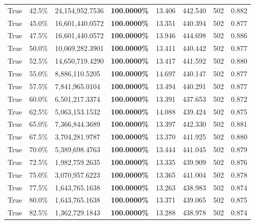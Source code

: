 \begin{table}[H]
{\begin{tabular}{lllrllll}
\cline{1-8}
True & 42.5\% & 24,154,952.7536 & \bfseries \color{red} 100.0000\% & 13.406 & 442.540 & 502 & 0.882 \\
\cline{1-8}
True & 45.0\% & 16,601,440.0572 & \bfseries \color{red} 100.0000\% & 13.351 & 440.394 & 502 & 0.877 \\
\cline{1-8}
True & 47.5\% & 16,601,440.0572 & \bfseries \color{red} 100.0000\% & 13.946 & 444.698 & 502 & 0.886 \\
\cline{1-8}
True & 50.0\% & 10,069,282.3901 & \bfseries \color{red} 100.0000\% & 13.411 & 440.442 & 502 & 0.877 \\
\cline{1-8}
True & 52.5\% & 14,650,719.4290 & \bfseries \color{red} 100.0000\% & 13.417 & 441.592 & 502 & 0.880 \\
\cline{1-8}
True & 55.0\% & 8,886,110.5205 & \bfseries \color{red} 100.0000\% & 14.697 & 440.147 & 502 & 0.877 \\
\cline{1-8}
True & 57.5\% & 7,841,965.0104 & \bfseries \color{red} 100.0000\% & 13.494 & 440.291 & 502 & 0.877 \\
\cline{1-8}
True & 60.0\% & 6,501,217.3374 & \bfseries \color{red} 100.0000\% & 13.391 & 437.653 & 502 & 0.872 \\
\cline{1-8}
True & 62.5\% & 5,063,153.1532 & \bfseries \color{red} 100.0000\% & 14.088 & 439.424 & 502 & 0.875 \\
\cline{1-8}
True & 65.0\% & 7,366,844.3689 & \bfseries \color{red} 100.0000\% & 13.397 & 442.330 & 502 & 0.881 \\
\cline{1-8}
True & 67.5\% & 3,704,281.9787 & \bfseries \color{red} 100.0000\% & 13.370 & 441.925 & 502 & 0.880 \\
\cline{1-8}
True & 70.0\% & 5,389,698.4763 & \bfseries \color{red} 100.0000\% & 13.444 & 441.045 & 502 & 0.879 \\
\cline{1-8}
True & 72.5\% & 1,982,759.2635 & \bfseries \color{red} 100.0000\% & 13.335 & 439.909 & 502 & 0.876 \\
\cline{1-8}
True & 75.0\% & 3,070,957.6223 & \bfseries \color{red} 100.0000\% & 13.365 & 441.004 & 502 & 0.878 \\
\cline{1-8}
True & 77.5\% & 1,643,765.1638 & \bfseries \color{red} 100.0000\% & 13.263 & 438.983 & 502 & 0.874 \\
\cline{1-8}
True & 80.0\% & 1,643,765.1638 & \bfseries \color{red} 100.0000\% & 13.371 & 439.065 & 502 & 0.875 \\
\cline{1-8}
True & 82.5\% & 1,362,729.1843 & \bfseries \color{red} 100.0000\% & 13.288 & 438.978 & 502 & 0.874 \\

\end{tabular}}
\end{table}
